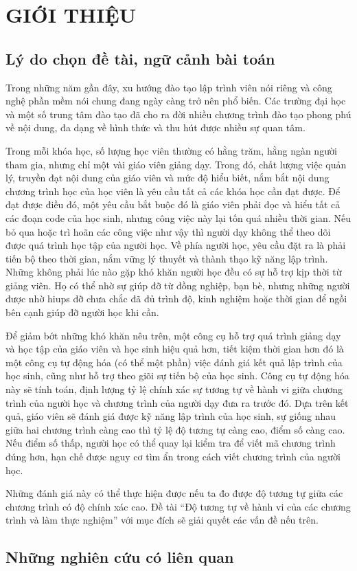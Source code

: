 \newpage
\chapter{GIỚI THIỆU}

\section{Lý do chọn đề tài, ngữ cảnh bài toán}
		
Trong những năm gần đây, xu hướng đào tạo lập trình viên nói riêng và công nghệ phần mềm nói chung đang ngày càng trở nên phổ biến. Các trường đại học và một số trung tâm đào tạo đã cho ra đời nhiều chương trình đào tạo phong phú về nội dung, đa dạng về hình thức và thu hút được nhiều sự quan tâm.
	
Trong mỗi khóa học, số lượng học viên thường có hằng trăm, hằng ngàn người tham gia, nhưng chỉ một vài giáo viên giảng dạy. Trong đó, chất lượng việc quản lý, truyền đạt nội dung của giáo viên và mức độ hiểu biết, nắm bắt nội dung chương trình học của học viên là yêu cầu tất cả các khóa học cần đạt được. Để đạt được điều đó, một yêu cầu bắt buộc đó là giáo viên phải đọc và hiểu tất cả các đoạn code của học sinh, nhưng công việc này lại tốn quá nhiều thời gian. Nếu bỏ qua hoặc trì hoãn các công việc như vậy thì người dạy không thể theo dõi được quá trình học tập của người học. Về phía người học, yêu cầu đặt ra là phải tiến bộ theo thời gian, nắm vững lý thuyết và thành thạo kỹ năng lập trình. Những không phải lúc nào gặp khó khăn người học đều có sự hỗ trợ kịp thời từ giảng viên. Họ có thể nhờ sự giúp đỡ từ đồng nghiệp, bạn bè, nhưng những người được nhờ hiups đỡ chưa chắc đã đủ trình độ, kinh nghiệm hoặc thời gian để ngồi bên cạnh giúp đỡ người học khi cần.
	
Để giảm bớt những khó khăn nêu trên, một công cụ hỗ trợ quá trình giảng dạy và học tập của giáo viên và học sinh hiệu quả hơn, tiết kiệm thời gian hơn đó là một công cụ tự động hóa (có thể một phần) việc đánh giá kết quả lập trình của học sinh, cũng như hỗ trợ theo giõi sự tiến bộ của học sinh. Công cụ tự động hóa này sẽ tính toán, định lượng tỷ lệ chính xác sự tương tự về hành vi giữa chương trình của người học và chương trình của người dạy đưa ra trước đó. Dựa trên kết quả, giáo viên sẽ đánh giá được kỹ năng lập trình của học sinh, sự giống nhau giữa hai chương trình càng cao thì tỷ lệ độ tương tự càng cao, điểm số càng cao. Nếu điểm số thấp, người học có thể quay lại kiểm tra để viết mã chương trình đúng hơn, hạn chế được nguy cơ tìm ẩn trong cách viết chương trình của người học.
	
Những đánh giá này có thể thực hiện được nếu ta đo được độ tương tự giữa các chương trình có độ chính xác cao. Đề tài “Độ tương tự về hành vi của các chương trình và làm thực nghiệm”  với mục đích sẽ giải quyết các vấn đề nếu trên.

\section{Những nghiên cứu có liên quan}


